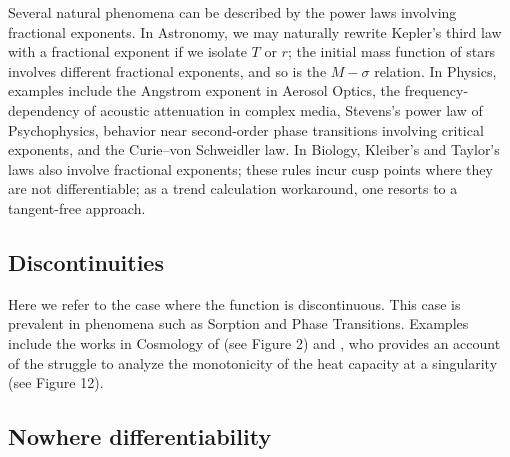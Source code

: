 \documentclass[11pt]{book}
\begin{document}
Several natural phenomena
can be described by the power laws involving fractional exponents. In Astronomy, we may naturally rewrite Kepler's third law with a fractional exponent
if we isolate $T$ or $r$; the initial mass function of stars involves
different fractional exponents, and so is the $M-\sigma$ relation.
In Physics, examples include the Angstrom exponent in Aerosol Optics,
the frequency-dependency of acoustic attenuation in complex media,
Stevens's power law of Psychophysics, behavior near second-order phase
transitions involving critical exponents, and the Curie--von Schweidler
law. In Biology, Kleiber's and Taylor's laws also involve fractional
exponents; these rules incur cusp points where they are
not differentiable; as a trend calculation workaround, one resorts
to a tangent-free approach.

\subsection{Discontinuities}

Here we refer to the case where the function is discontinuous. This case
is prevalent in phenomena such as Sorption and Phase Transitions. Examples include the works in Cosmology of \cite{kumar2020phase} (see Figure 2) and 
\cite{schwartzlecture}, who provides an account of the struggle to analyze the monotonicity
of the heat capacity at a singularity (see Figure 12).


\subsection{Nowhere differentiability}
\end{document}
